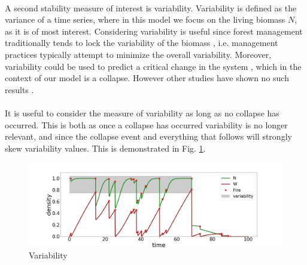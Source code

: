 \documentclass{article}
\begin{document}
\paragraph{}
A second stability measure of interest is variability. Variability is defined as the variance of a time series, where in this model we focus on the living biomass $N$, as it is of most interest. Considering variability is useful since forest management traditionally tends to lock the variability of the biomass \citep{bergeron_natural_2002}, i.e. management practices typically attempt to minimize the overall variability. Moreover, variability could be used to predict a critical change in the system \citep{karr_population_1982, pimm_risk_1988, bengtsson_predicting_1995}, which in the context of our model is a collapse. However other studies have shown no such results \citep{bengtsson_interspecific_1989, pollard_extinction_1992}. %


\paragraph{}
It is useful to consider the measure of variability as long as no collapse has occurred. This is both as once a collapse has occurred variability is no longer relevant, and since the collapse event and everything that follows will strongly skew variability values. This is demonstrated in Fig. \ref{fig:variability1}.

\begin{figure}[h!]
\centering
\includegraphics[width=12.cm]{time_series_sd_1.png}
\caption{Variability
\label{fig:variability1} 
}
\end{figure}
\end{document}

